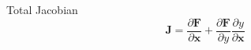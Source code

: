\vspace{-0.3in}
\begin{block}{Total Jacobian}
\begin{equation*}
\mathbf{J} = \frac{\partial \mathbf{F}}{\partial \mathbf{x}} + \frac{\partial \mathbf{F}}{\partial y} \frac{\partial y}{\partial \mathbf{x}}
\end{equation*}
\end{block}

